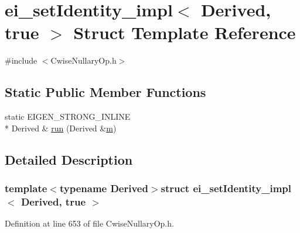 \hypertarget{structei__set_identity__impl_3_01_derived_00_01true_01_4}{\section{ei\-\_\-set\-Identity\-\_\-impl$<$ Derived, true $>$ Struct Template Reference}
\label{structei__set_identity__impl_3_01_derived_00_01true_01_4}
}


{\ttfamily \#include $<$Cwise\-Nullary\-Op.\-h$>$}

\subsection*{Static Public Member Functions}
\begin{DoxyCompactItemize}
\item 
static E\-I\-G\-E\-N\-\_\-\-S\-T\-R\-O\-N\-G\-\_\-\-I\-N\-L\-I\-N\-E \\*
Derived \& \hyperlink{structei__set_identity__impl_3_01_derived_00_01true_01_4_a9e7a78988122f819e29d6f480b674045}{run} (Derived \&\hyperlink{glext_8h_af593500c283bf1a787a6f947f503a5c2}{m})
\end{DoxyCompactItemize}


\subsection{Detailed Description}
\subsubsection*{template$<$typename Derived$>$struct ei\-\_\-set\-Identity\-\_\-impl$<$ Derived, true $>$}



Definition at line 653 of file Cwise\-Nullary\-Op.\-h.



